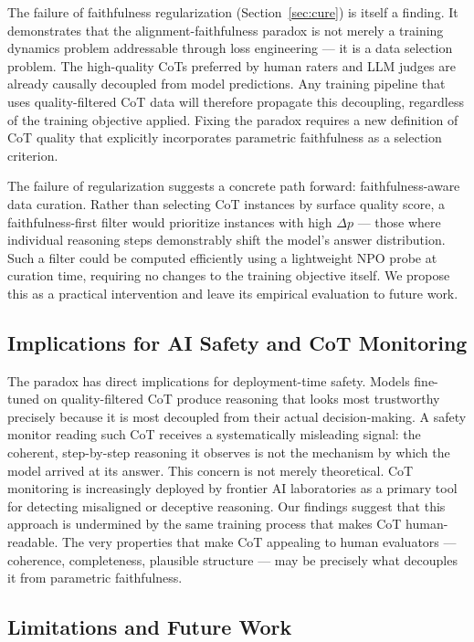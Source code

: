 \documentclass[11pt]{article}
\begin{document}
The failure of faithfulness regularization (Section~\ref{sec:cure}) is itself
a finding. It demonstrates that the alignment-faithfulness paradox is not
merely a training dynamics problem addressable through loss engineering --- it
is a data selection problem. The high-quality CoTs preferred by human raters
and LLM judges are already causally decoupled from model predictions. Any
training pipeline that uses quality-filtered CoT data will therefore propagate
this decoupling, regardless of the training objective applied. Fixing the
paradox requires a new definition of CoT quality that explicitly incorporates
parametric faithfulness as a selection criterion.

The failure of regularization suggests a concrete path forward:
faithfulness-aware data curation. Rather than selecting CoT instances by surface
quality score, a faithfulness-first filter would prioritize instances with high
$\Delta p$ --- those where individual reasoning steps demonstrably shift the
model's answer distribution. Such a filter could be computed efficiently using a
lightweight NPO probe at curation time, requiring no changes to the training
objective itself. We propose this as a practical intervention and leave its
empirical evaluation to future work.

\subsection{Implications for AI Safety and CoT Monitoring}

The paradox has direct implications for deployment-time safety. Models
fine-tuned on quality-filtered CoT produce reasoning that looks most
trustworthy precisely because it is most decoupled from their actual
decision-making. A safety monitor reading such CoT receives a systematically
misleading signal: the coherent, step-by-step reasoning it observes is not the
mechanism by which the model arrived at its answer. This concern is not merely
theoretical. CoT monitoring is increasingly deployed by frontier AI laboratories
as a primary tool for detecting misaligned or deceptive reasoning. Our findings
suggest that this approach is undermined by the same training process that makes
CoT human-readable. The very properties that make CoT appealing to human
evaluators --- coherence, completeness, plausible structure --- may be precisely
what decouples it from parametric faithfulness.

\subsection{Limitations and Future Work}
\end{document}

